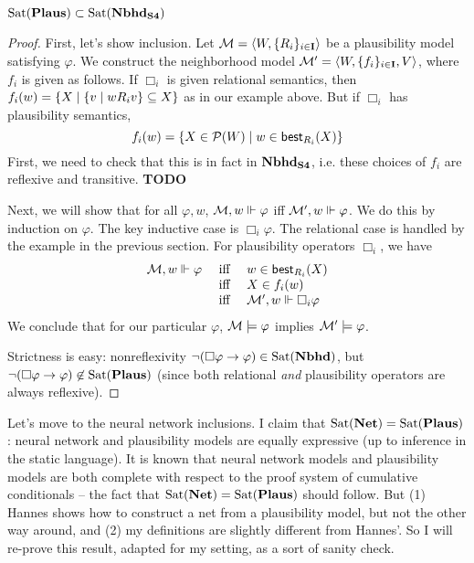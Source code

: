 \documentclass[letterpaper]{article}
\begin{document}

\begin{proposition}
    $\mathrm{Sat}( \textrm{\textbf{Plaus}} ) \subset \mathrm{Sat}( \textrm{\textbf{Nbhd}}_\textrm{\textbf{S4}} )$
\end{proposition}
\begin{proof}
    First, let's show inclusion.  Let $\mathcal{M} = \langle W, \{ R_i \}_{i \in \textbf{I}} \rangle$ be a plausibility model satisfying $\varphi$.  We construct the neighborhood model $\mathcal{M}' = \langle W, \{ f_i \}_{i \in \textbf{I}}, V \rangle$, where $f_i$ is given as follows.  If $\Box_i$ is given relational semantics, then $f_i(w) = \{ X \mid \{ v \mid w{R_i}v  \}\subseteq X \}$ as in our example above.  But if $\Box_i$ has plausibility semantics,
    \[
        f_i(w) = \{ X \in \mathcal{P}(W) \mid w \in \mathsf{best}_{R_i}(X) \}
    \]
    First, we need to check that this is in fact in $\textrm{\textbf{Nbhd}}_\textrm{\textbf{S4}}$, i.e. these choices of $f_i$ are reflexive and transitive.  \textbf{TODO}

    Next, we will show that for all $\varphi, w$, $\mathcal{M}, w \Vdash \varphi$ iff $\mathcal{M}', w \Vdash \varphi$.  We do this by induction on $\varphi$.  The key inductive case is $\Box_i \varphi$.  The relational case is handled by the example in the previous section.  For plausibility operators $\Box_i$, we have
    \[
    \begin{array}{lcl}
        \mathcal{M}, w \Vdash \varphi & \mbox{ iff } & w \in \mathsf{best}_{R_i}(X) \\
        & \mbox{ iff } & X \in f_i(w) \\
        & \mbox{ iff } & \mathcal{M}', w \Vdash \Box_i \varphi
    \end{array}
    \]
    We conclude that for our particular $\varphi$, $\mathcal{M} \models \varphi$ implies $\mathcal{M}' \models \varphi$.

    Strictness is easy: nonreflexivity $\neg (\Box \varphi \to \varphi) \in \mathrm{Sat}( \textrm{\textbf{Nbhd}} )$, but $\neg (\Box \varphi \to \varphi) \not \in \mathrm{Sat}( \textrm{\textbf{Plaus}} )$ (since both relational \emph{and} plausibility operators are always reflexive).
\end{proof}

Let's move to the neural network inclusions.  I claim that $\mathrm{Sat}( \textrm{\textbf{Net}} ) = \mathrm{Sat}( \textrm{\textbf{Plaus}} )$: neural network and plausibility models are equally expressive (up to inference in the static language).  It is known that neural network models and plausibility models are both complete with respect to the proof system of cumulative conditionals \cite{leitgeb2001nonmonotonic, leitgeb2003nonmonotonic} -- the fact that $\mathrm{Sat}( \textrm{\textbf{Net}} ) = \mathrm{Sat}( \textrm{\textbf{Plaus}} )$ should follow.  But (1) Hannes shows how to construct a net from a plausibility model, but not the other way around, and (2) my definitions are slightly different from Hannes'.  So I will re-prove this result, adapted for my setting, as a sort of sanity check.
\end{document}
